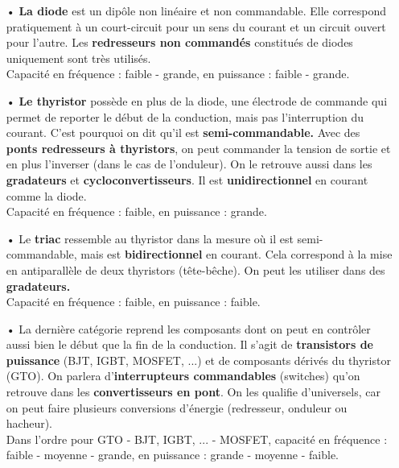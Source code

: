 		\begin{itemize}
			\item[•] \textbf{La diode} est un dipôle non linéaire et non commandable. Elle correspond pratiquement à un court-circuit pour un sens du courant et un circuit ouvert pour l'autre. Les \textbf{redresseurs non commandés} constitués de diodes uniquement sont très utilisés. \\
			Capacité en fréquence : faible - grande, en puissance : faible - grande.\\
			
			\item[•] \textbf{Le thyristor} possède en plus de la diode, une électrode de commande qui permet de reporter le début de la conduction, mais pas l'interruption du courant. C'est pourquoi on dit qu'il est \textbf{semi-commandable.}  Avec des \textbf{ponts redresseurs à thyristors}, on peut commander la tension de sortie et en plus l'inverser (dans le cas de l'onduleur). On le retrouve aussi dans les \textbf{gradateurs} et \textbf{cycloconvertisseurs}. Il est \textbf{unidirectionnel} en courant comme la diode. \\
			Capacité en fréquence : faible, en puissance : grande.\\
			
			\item[•] Le \textbf{triac} ressemble au thyristor dans la mesure où il est semi-commandable, mais est \textbf{bidirectionnel} en courant. Cela correspond à la mise en antiparallèle de deux thyristors (tête-bêche). On peut les utiliser dans des \textbf{gradateurs.}\\
			Capacité en fréquence : faible, en puissance : faible.\\
			
			\item[•] La dernière catégorie reprend les composants dont on peut en contrôler aussi bien le début que la fin de la conduction. Il s'agit de \textbf{transistors de puissance} (BJT, IGBT, MOSFET, ...) et de composants dérivés du thyristor (GTO). On parlera d'\textbf{interrupteurs commandables} (switches) qu'on retrouve dans les \textbf{convertisseurs en pont}. On les qualifie d'universels, car on peut faire plusieurs conversions d'énergie (redresseur, onduleur ou hacheur). \\
			Dans l'ordre pour GTO - BJT, IGBT, ... - MOSFET, capacité en fréquence : faible - moyenne - grande, en puissance : grande - moyenne - faible. 
		\end{itemize}
		
